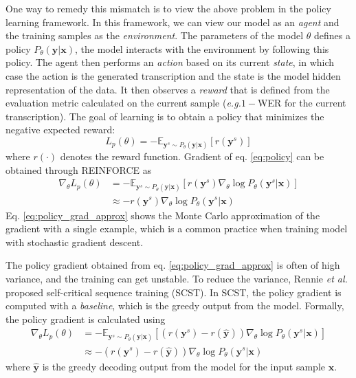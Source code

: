 \documentclass{article}
\newcommand{\eg}{\emph{e.g.}\xspace}
\newcommand{\etal}{\emph{et al.}\xspace}
\begin{document}
One way to remedy this mismatch is to view the above problem in the policy learning framework. In this framework, we can view our model as an \emph{agent} and the training samples as the \emph{environment}. The parameters of the model $\theta$ defines a policy $P_\theta(\mathbf{y}|\mathbf{x})$, the model interacts with the environment by following this policy. The agent then performs an \emph{action} based on its current \emph{state}, in which case the action is the generated transcription and the state is the model hidden representation of the data. It then observes a \emph{reward} that is defined from the evaluation metric
calculated on the current sample (\eg $1 -$WER for the current transcription). The goal of learning is to obtain a policy that minimizes the negative expected reward:
\begin{equation}
\label{eq:policy}
L_p(\theta) = - \mathbb{E}_{\mathbf{y}^s\sim P_\theta(\mathbf{y}|\mathbf{x})}[r(\mathbf{y}^s)]
\end{equation}
where $r(\cdot)$ denotes the reward function. Gradient of eq. \ref{eq:policy} can be obtained through REINFORCE \cite{williams1992simple} as
\begin{align}
\label{eq:policy_grad}
\nabla_\theta L_p(\theta) &= - \mathbb{E}_{\mathbf{y}^s\sim P_\theta(\mathbf{y}|\mathbf{x})}[r(\mathbf{y}^s)\nabla_\theta \log P_\theta(\mathbf{y}^s|\mathbf{x})] \\
\label{eq:policy_grad_approx}
& \approx -r(\mathbf{y}^s)\nabla_\theta \log P_\theta(\mathbf{y}^s|\mathbf{x})
\end{align}
Eq. \ref{eq:policy_grad_approx} shows the Monte Carlo approximation of the gradient with a single example, which is a common practice when training model with stochastic gradient descent.


The policy gradient obtained from eq. \ref{eq:policy_grad_approx} is often of high variance, and the training can get unstable. To reduce the variance, Rennie \etal \cite{rennie2016self} proposed self-critical sequence training (SCST). In SCST, the policy gradient is computed with a \emph{baseline}, which is the greedy output from the model. Formally, the policy gradient is calculated using
\begin{align}
\nabla_\theta L_p(\theta) &= - \mathbb{E}_{\mathbf{y}^s\sim P_\theta(\mathbf{y}|\mathbf{x})}[\left(r(\mathbf{y}^s) - r(\hat{\mathbf{y}})\right) \nabla_\theta \log P_\theta(\mathbf{y}^s|\mathbf{x})] \\
\label{eq:scst_approx}
& \approx -\left(r(\mathbf{y}^s) - r(\hat{\mathbf{y}})\right) \nabla_\theta \log P_\theta(\mathbf{y}^s|\mathbf{x})
\end{align}
where $\hat{\mathbf{y}}$ is the greedy decoding output from the model for the input sample $\mathbf{x}$.
\end{document}

